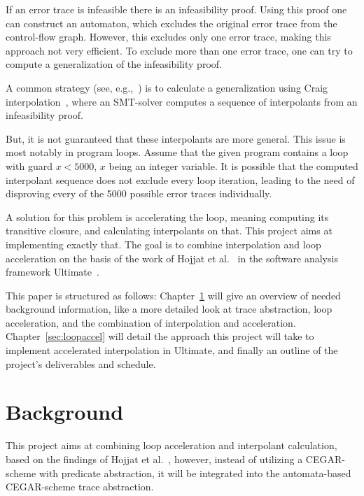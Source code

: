 \documentclass{article}
\newcommand\mycom[1]{}
\newcommand\mycom[1]{#1}
\newcommand{\dd}[1]{\mycom{\todo[color=orange!40,inline]{\small DD: #1}}}
\newcommand{\ts}[1]{\mycom{\todo[color=green!40,inline]{\small TS: #1}}}
\begin{document}
If an error trace is infeasible there is an infeasibility proof. \dd{what is an infeasibility proof? you can just write a half-sentence for that }
Using this proof one can construct an automaton, which excludes the original error trace from the control-flow graph. \dd{what does this automaton do? What language does it recognize?}
However, this excludes only one error trace, making this approach not very efficient.
To exclude more than one error trace, one can try to compute a generalization of the infeasibility proof.

A common strategy (see, e.g.,~\cite{10.1007/978-3-642-03237-0_7}) is to calculate a generalization using Craig interpolation~\cite{craig_1957}, where an SMT-solver computes a sequence of interpolants from an infeasibility proof. \dd{and then?}

But, it is not guaranteed that these interpolants are more general. \dd{In general, yes, but this is usually not the issue. It is not guaranteed that they are general enough!}
This issue is most notably in program loops.
Assume that the given program contains a loop with guard $x < 5000$, $x$ being an integer variable.
It is possible that the computed interpolant sequence does not exclude every loop iteration, leading to the need of disproving every of the 5000 possible error traces individually.
\dd{What is a interpolant sequence?}
\bigskip

A solution for this problem is accelerating the loop, meaning computing its transitive closure, and calculating interpolants on that.\ts{more precisely? (interpolants are not computed from the loop)}
This project aims at implementing exactly that.
The goal is to combine interpolation and loop acceleration on the basis of the work of Hojjat et al.~\cite{10.1007/978-3-642-33386-6_16} in the software analysis framework Ultimate~\cite{Zitat02}.

This paper is structured as follows:
Chapter~\ref{sec:background} will give an overview of needed background information, like a more detailed look at trace abstraction, loop acceleration, and the combination of interpolation and acceleration.
Chapter~\ref{sec:loopaccel} will detail the approach this project will take to implement accelerated interpolation in Ultimate, and finally an outline of the project's deliverables and schedule.
\dd{first mention of ``accelerated interpolation'' -- perhaps introduce it explicitly by saying ``we call this combination \ldots''}

\section{Background}\label{sec:background}
This project aims at combining loop acceleration and interpolant calculation, based on the findings of Hojjat et al.~\cite{10.1007/978-3-642-33386-6_16}, however, instead of utilizing a CEGAR-scheme with predicate abstraction, it will be integrated into the automata-based CEGAR-scheme trace abstraction.
\end{document}
